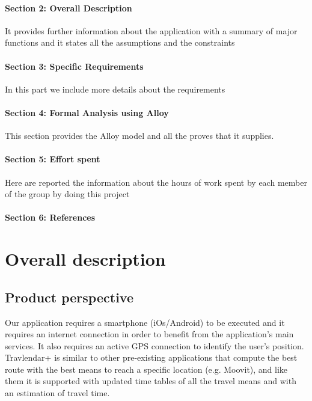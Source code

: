 \documentclass[12pt,titlepage]{article}
\begin{document}
\paragraph{Section 2: Overall Description}
It provides further information about the application with a summary of major functions and it states all the assumptions and the constraints 
\paragraph{Section 3: Specific Requirements}
In this part we include more details about the requirements 
\paragraph{Section 4: Formal Analysis using Alloy}
This section provides the Alloy model and all the proves that it supplies.
\paragraph{Section 5: Effort spent}
Here are reported the information about the hours of work spent by each member of the group by doing this project 
\paragraph{Section 6: References}
\pagebreak

\section{Overall description}\label{sec:crit}

\subsection{Product perspective}\label{sec:mod1}
Our application requires a smartphone (iOs/Android) to be executed and it requires an internet connection in order to benefit from the application's main services.
It also requires an active GPS connection to identify the user's position. 
Travlendar+ is similar to other pre-existing applications that compute the best route with the best means to reach a specific location (e.g. Moovit), and like them it is supported with updated time tables of all the travel means and with an estimation of travel time. 
\end{document}
